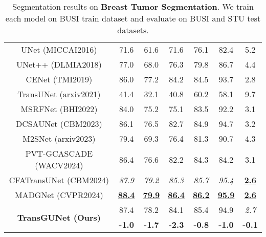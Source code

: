 \begin{table}[h]
\begin{tabular}{c|cccccc}
     \hline
     UNet \tiny{(MICCAI2016)}       & 71.6 & 61.6 & 71.6 & 76.1 & 82.4 & 5.2 \\
     UNet++ \tiny{(DLMIA2018)}      & 77.0 & 68.0 & 76.3 & 79.8 & 86.7 & 4.4 \\
     CENet \tiny{(TMI2019)}         & 86.0 & 77.2 & 84.2 & 84.5 & 93.7 & 2.8 \\
     TransUNet \tiny{(arxiv2021)}   & 41.4 & 32.1 & 40.8 & 60.2 & 58.1 & 9.7 \\
     MSRFNet \tiny{(BHI2022)}       & 84.0 & 75.2 & 75.1 & 83.5 & 92.2 & 3.1 \\
     DCSAUNet \tiny{(CBM2023)}      & 86.1 & 76.5 & 82.7 & 84.9 & 94.7 & 3.2 \\
     M2SNet \tiny{(arxiv2023)}      & 79.4 & 69.3 & 76.4 & 81.3 & 90.7 & 4.3 \\
     PVT-GCASCADE \tiny{(WACV2024)} & 86.4 & 76.6 & 82.2 & 84.3 & 84.2 & 3.1 \\
     CFATransUNet \tiny{(CBM2024)}  & \textit{87.9} & \textit{79.2} & \textit{85.3} & \textit{85.7} & \textit{95.4} & \textbf{\underline{2.6}} \\
     MADGNet \tiny{(CVPR2024)}      & \textbf{\underline{88.4}} & \textbf{\underline{79.9}} & \textbf{\underline{86.4}} & \textbf{\underline{86.2}} & \textbf{\underline{95.9}} & \textbf{\underline{2.6}} \\
     \hline
     \multicolumn{1}{c|}{\multirow{2}{*}{\textbf{TransGUNet \tiny{(Ours)}}}}     & 87.4 & 78.2 & 84.1 & 85.4 & 94.9 & \textit{2.7} \\ \cline{2-7}
     & \textbf{-1.0} & \textbf{-1.7} & \textbf{-2.3} & \textbf{-0.8} & \textbf{-1.0} & \textbf{-0.1} \\
    \hline
    \end{tabular}
    \caption{Segmentation results on \textbf{Breast Tumor Segmentation}. We train each model on BUSI \cite{al2020dataset} train dataset and evaluate on BUSI \cite{al2020dataset} and STU \cite{zhuang2019rdau} test datasets.}
    \label{tab:comparison_sota_ultrasound_other_metrics}
\end{table}

